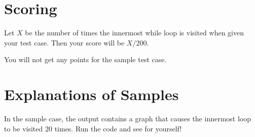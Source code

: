 \section*{Scoring}
Let $X$ be the number of times the innermost while loop is visited when given your test case.
Then your score will be $X / 200$.

You will not get any points for the sample test case.

\section*{Explanations of Samples}
In the sample case, the output contains a graph that causes the innermost loop to be visited $20$
times. Run the code and see for yourself!
